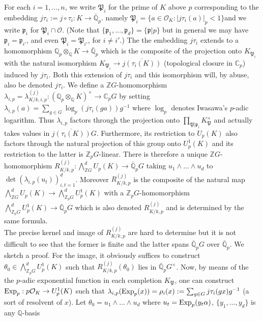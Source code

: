 \documentclass[12pt]{article}
\newcounter{rem}[section]%
\newcommand{\barbbQ}{\ensuremath{\bar{\bbQ}}}
\newcommand{\barbbQp}{\ensuremath{\bar{\bbQ}_p}}
\newcommand{\bbC}{\ensuremath{\mathbb{C}}}
\newcommand{\bbQ}{\ensuremath{\mathbb{Q}}}
\newcommand{\bbZ}{\ensuremath{\mathbb{Z}}}
\newcommand{\cO}{\ensuremath{\mathcal{O}}}
\newcommand{\fp}{\ensuremath{\mathfrak{p}}}
\newcommand{\fP}{\ensuremath{\mathfrak{P}}}
\newcommand{\inv}{^{-1}}%
\newcommand{\rem}{\refstepcounter{rem}\noindent{\sc Remark \therem}}%
\renewcommand{\therem}{\thesection.\arabic{rem}}
\begin{document}
For each $i=1,\ldots,n$, we write $\fP_i$ for the prime of $K$ above $p$
corresponding to the embedding $j\tau_i:=j\circ\tau_i:K\rightarrow\barbbQp$.
namely $\fP_i=\{a\in\cO_K:|j\tau_i(a)|_p<1\}$and we write $\fp_i$ for $\fP_i\cap\cO$.
(Note that $\{\fp_1,\ldots,\fp_d\}=\{\fp|p\}$ but in general we may have $\fp_i=\fp_{i'}$, and even $\fP_i=\fP_{i'}$,
for $i\neq i'$.) The the embedding $j\tau_i$
extends to a homomorphism $\bbQ_p\otimes_\bbQ K\rightarrow\barbbQp$
which is the composite of the projection onto $K_{\fP_i}$
with the natural isomorphism $K_{\fP_i}\rightarrow\overline{j(\tau_i(K))}$
(topological closure in $\bbC_p$) induced by $j\tau_i$.
Both this extension of $j\tau_i$ and this isomorphism will, by abuse,
also be denoted $j\tau_i$.
We define a $\bbZ G$-homomorphism
$\lambda_{i,p}=\lambda^{(j)}_{K/k,i,p}:(\bbQ_p\otimes_\bbQ K)^\times\rightarrow\bbC_p G$ by setting
$\lambda_{i,p}(a)=\sum_{g\in G}\log_p(j\tau_i(ga))g\inv$ where
$\log_p$ denotes Iwasawa's $p$-adic logarithm.
Thus $\lambda_{i,p}$ factors through the projection onto $\prod_{\fP|\fp_i}K_\fP^\times$
and actually takes values in $\overline{j(\tau_i(K))}G$. Furthermore, its restriction to
$U_p(K)$ also factors through the natural projection of this group onto $U^1_p(K)$ and
its restriction to the latter is $\bbZ_p G$-linear. There is therefore a unique
$\bbZ G$-homomorphism $R_{K/k,p}^{(j)}:\bigwedge_{\bbZ G}^dU_p(K)\rightarrow\barbbQ_p G$
taking $u_1\wedge\ldots\wedge u_d$ to $\det(\lambda_{i,p}(u_t))_{i,t=1}^d$.
Moreover $R^{(j)}_{K/k,p}$ is the composite of the natural map
$\bigwedge_{\bbZ G}^dU_p(K)\rightarrow\bigwedge_{\bbZ_p G}^dU^1_p(K)$
with a $\bbZ_p G$-homomorphism
$\bigwedge_{\bbZ_p G}^dU^1_p(K)\rightarrow\barbbQ_p G$ which is also denoted $R^{(j)}_{K/k,p}$
and is determined by the same formula.\vspace{1ex}\\
\rem\label{rem:imR}
The precise kernel and image of $R^{(j)}_{K/k,p}$ are hard to determine but
it is not difficult to see that the former is finite
and the latter spans $\barbbQ_pG$ over $\barbbQ_p$.
We sketch a proof. For the image, it obviously
suffices to construct $\theta_0\in\bigwedge_{\bbZ_p G}^dU^1_p(K)$ such
that $R^{(j)}_{K/k,p}(\theta_0)$ lies in $\barbbQ_pG^\times$.
Now, by means of the the $p$-adic exponential function in each completion $K_\fP$,
one can construct ${\rm Exp}_p:p\cO_K\rightarrow U^1_p(K)$ such that
$\lambda_{i,p}({\rm Exp}_p(x))=\rho_i(x):=\sum_{g\in G}j\tau_i(gx)g\inv$
(a sort of resolvent of $x$). Let $\theta_0=u_1\wedge\ldots\wedge u_d$
where $u_t={\rm Exp}_p(y_t\alpha)$, $\{y_1,\ldots,y_d\}$ is any $\bbQ$-basis
\end{document}
